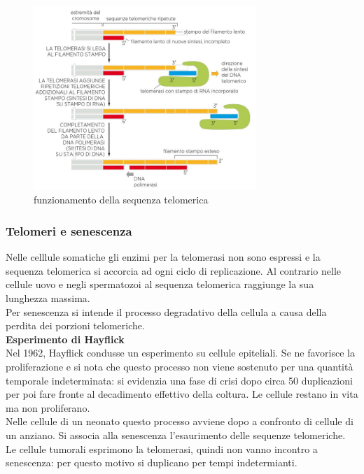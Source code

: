             \begin{figure}[h]
                \centering
                \includegraphics[width=0.75\textwidth]{images/telomero.JPG}
                \caption{\small funzionamento della sequenza telomerica}
                \label{fig:mesh1}
            \end{figure}
            
            \subsubsection{Telomeri e senescenza}
                Nelle celllule somatiche gli enzimi per la telomerasi non sono espressi e la sequenza telomerica si accorcia ad ogni ciclo di replicazione. 
                Al contrario nelle cellule uovo e negli spermatozoi al sequenza telomerica raggiunge la sua lunghezza massima.\\
                Per senescenza si intende il processo degradativo della cellula a causa della perdita dei porzioni telomeriche.\\
                
                \textbf{Esperimento di Hayflick}\\
                Nel 1962, Hayflick condusse un esperimento su cellule epiteliali. Se ne favorisce la proliferazione e si nota che questo processo non viene sostenuto per una quantità temporale indeterminata:
                si evidenzia una fase di crisi dopo circa 50 duplicazioni per poi fare fronte al decadimento effettivo della coltura. Le cellule restano in vita ma non proliferano.\\
                Nelle cellule di un neonato questo processo avviene dopo a confronto di cellule di un anziano. Si associa alla senescenza l'esaurimento delle sequenze telomeriche.\\
                Le cellule tumorali esprimono la telomerasi, quindi non vanno incontro a senescenza: per questo motivo si duplicano per tempi indetermianti.
                
